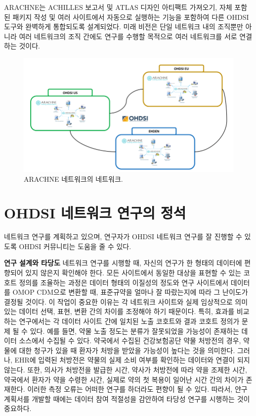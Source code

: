 \documentclass[11pt]{book}
\theoremstyle{definition}
\theoremstyle{definition}
\theoremstyle{definition}
\theoremstyle{remark}
\begin{document}
ARACHNE는 ACHILLES 보고서 및 ATLAS 디자인 아티팩트 가져오기, 자체 포함된
패키지 작성 및 여러 사이트에서 자동으로 실행하는 기능을 포함하여 다른
OHDSI 도구와 완벽하게 통합되도록 설계되었다. 미래 비전은 단일 네트워크
내의 조직뿐만 아니라 여러 네트워크의 조직 간에도 연구를 수행할 목적으로
여러 네트워크를 서로 연결하는 것이다.

\begin{figure}[h]

{\centering \includegraphics[width=0.9\linewidth]{images/NetworkStudies/ARACHNENON} 

}

\caption{ARACHNE 네트워크의 네트워크.}\label{fig:arachneNon}
\end{figure}

\section{OHDSI 네트워크 연구의 정석}\label{ohdsi---}


네트워크 연구를 계획하고 있으며, 연구자가 OHDSI 네트워크 연구를 잘
진행할 수 있도록 OHDSI 커뮤니티는 도움을 줄 수 있다.

\textbf{연구 설계와 타당도} 네트워크 연구를 시행할 때, 자신의 연구가 한
형태의 데이터에 편향되어 있지 않은지 확인해야 한다. 모든 사이트에서
동일한 대상을 표현할 수 있는 코호트 정의를 조율하는 과정은 데이터 형태의
이질성의 정도와 연구 사이트에서 데이터를 OMOP CDM으로 변환할 때,
표준규약을 얼마나 잘 따랐는지에 따라 그 난이도가 결정될 것이다. 이
작업이 중요한 이유는 각 네트워크 사이트와 실제 임상적으로 의미 있는
데이터 선택, 표현, 변환 간의 차이를 조정해야 하기 때문이다. 특히, 효과를
비교하는 연구에서는 각 데이터 사이트 간에 일치된 노출 코호트와 결과
코호트 정의가 문제 될 수 있다. 예를 들면, 약물 노출 정도는 분류가
잘못되었을 가능성이 존재하는 데이터 소스에서 수집될 수 있다. 약국에서
수집된 건강보험공단 약물 처방전의 경우, 약물에 대한 청구가 있을 때
환자가 처방을 받았을 가능성이 높다는 것을 의미한다. 그러나, EHR에 입력된
처방전은 약물의 실제 소비 여부를 확인하는 데이터와 연결이 되지 않는다.
또한, 의사가 처방전을 발급한 시간, 약사가 처방전에 따라 약을 조제한
시간, 약국에서 환자가 약을 수령한 시간, 실제로 약의 첫 복용이 일어난
시간 간의 차이가 존재한다. 이러한 측정 오류는 어떠한 연구를 하더라도
편향이 될 수 있다. 따라서, 얀구 계획서를 개발할 때에는 데이터 참여
적절성을 감안하여 타당성 연구를 시행하는 것이 중요하다.
\end{document}

